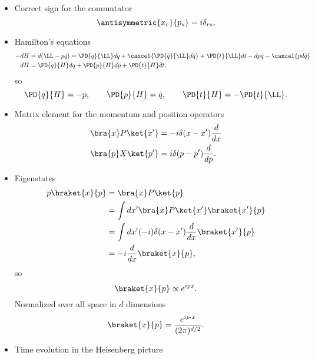 \begin{itemize}
\item Correct sign for the commutator
\begin{dmath}\label{eqn:usefulFormulas:80}
\antisymmetric{x_r}{p_s} = i \delta_{rs}.
\end{dmath}
\item Hamilton's equations
\begin{dmath}\label{eqn:usefulFormulas:100}
\begin{aligned}
-dH &= d(\LL - p \dot{q}) = \PD{q}{\LL} dq + \cancel{\PD{\dot{q}}{\LL} d\dot{q}} + \PD{t}{\LL} dt - dp \dot{q} - \cancel{p d\dot{q}} \\
dH &=
\PD{q}{H} dq
+
\PD{p}{H} dp
+
\PD{t}{H} dt,
\end{aligned}
\end{dmath}
so
\begin{equation}\label{eqn:usefulFormulas:120}
\PD{q}{H} = -\dot{p},\qquad
\PD{p}{H} = \dot{q},\qquad
\PD{t}{H} = -\PD{t}{\LL}.
\end{equation}
\item Matrix element for the momentum and position operators
\begin{dmath}\label{eqn:usefulFormulas:140}
\begin{aligned}
\bra{x} P \ket{x'} &= -i \delta(x- x') \frac{d}{dx} \\
\bra{p} X \ket{p'} &= i \delta(p- p') \frac{d}{dp}.
\end{aligned}
\end{dmath}
\item Eigenstates
\begin{dmath}\label{eqn:usefulFormulas:160}
\begin{aligned}
p \braket{x}{p}
&= \bra{x} P \ket{p} \\
&= \int dx' \bra{x} P \ket{x'} \braket{x'}{p} \\
&= \int dx' (-i) \delta(x - x') \frac{d}{dx} \braket{x'}{p} \\
&= -i \frac{d}{dx} \braket{x}{p},
\end{aligned}
\end{dmath}
so
\begin{dmath}\label{eqn:usefulFormulas:180}
\braket{x}{p} \propto e^{i p x}.
\end{dmath}
Normalized over all space in \( d \) dimensions
\begin{dmath}\label{eqn:usefulFormulas:200}
\braket{x}{p} = \frac{e^{i p \cdot x}}{(2 \pi)^{d/2}}.
\end{dmath}
\item Time evolution in the Heisenberg picture

\end{itemize}
